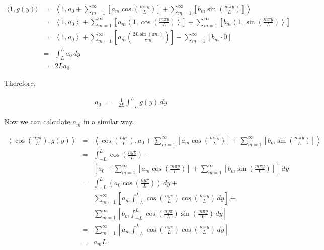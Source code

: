 \documentclass[10pt]{article}
\begin{document}
\begin{easylist}[enumerate]
    \begin{align*}
        \langle 1, g(y) \rangle &=& \left\langle 1 ,
            a_0 + \sum_{m=1}^\infty \left[ a_m \cos \left( \frac{m \pi y}{L} \right) \right] +
            \sum_{m=1}^\infty \left[ b_m \sin \left( \frac{m \pi y}{L} \right) \right] \right\rangle\\
        &=& \left\langle 1 , a_0 \right\rangle + \sum_{m=1}^\infty \left[ a_m \left\langle 1, \cos \left( \frac{m \pi y}{L} \right) \right\rangle\right] +
            \sum_{m=1}^\infty \left[ b_m \left\langle 1, \sin \left( \frac{m \pi y}{L} \right) \right\rangle \right] \\
        &=& \left\langle 1 , a_0 \right\rangle + \sum_{m=1}^\infty \left[ a_m \left( \frac{2 L \sin (\pi  m)}{\pi m} \right) \right] +
            \sum_{m=1}^\infty \left[ b_m \cdot 0 \right] \\
        &=& \int_{L}^L a_0 \, dy\\
        &=& 2L a_0
    \end{align*}

    Therefore,

    \begin{align*}
        a_0 &=& \frac{1}{2L} \int_{-L}^L g(y) \, dy
    \end{align*}

    Now we can calculate $a_m$ in a similar way.

    \begin{align*}
        \left\langle \cos \left( \frac{ ny\pi }{L} \right) , g(y) \right\rangle &=& \left\langle \cos \left( \frac{ ny\pi }{L} \right),
            a_0 + \sum_{m=1}^\infty \left[ a_m \cos \left( \frac{m \pi y}{L} \right) \right] +
            \sum_{m=1}^\infty \left[ b_m \sin \left( \frac{m \pi y}{L} \right) \right] \right\rangle\\
        &=& \int_{-L}^L \cos \left( \frac{ ny\pi }{L} \right) \cdot\\
            &&\left[ a_0 + \sum_{m=1}^\infty \left[ a_m \cos \left( \frac{m \pi y}{L} \right) \right] +
            \sum_{m=1}^\infty \left[ b_m \sin \left( \frac{m \pi y}{L} \right) \right] \right] \, dy\\
        &=& \int_{-L}^L \left( a_0 \cos\left(\frac{ny\pi}{L}\right) \right) \, dy +\\
            &&\sum_{m=1}^\infty \left[ a_m \int_{-L}^L \cos\left(\frac{ny\pi}{L}\right) \cos \left( \frac{m \pi y}{L} \right) \, dy \right] +\\
            &&\sum_{m=1}^\infty \left[ b_m \int_{-L}^L \cos\left(\frac{ny\pi}{L}\right) \sin \left( \frac{m \pi y}{L} \right) \, dy \right]\\
        &=& \sum_{m=1}^\infty \left[ a_m \int_{-L}^L \cos\left(\frac{ny\pi}{L}\right) \cos \left( \frac{m \pi y}{L} \right) \, dy \right]\\
        &=& a_m L\\
    \end{align*}


\end{easylist}
\end{document}
